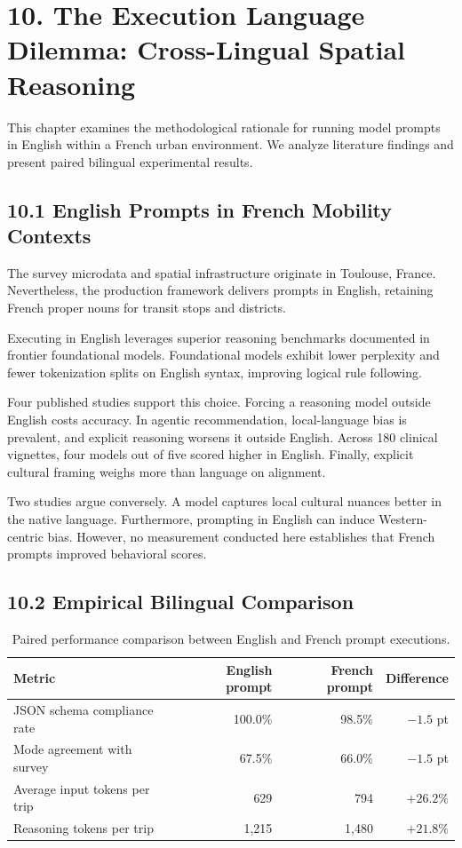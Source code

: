 \section{10. The Execution Language Dilemma: Cross-Lingual Spatial Reasoning}

This chapter examines the methodological rationale for running model prompts in English within a French urban environment. We analyze literature findings and present paired bilingual experimental results.

\subsection{10.1 English Prompts in French Mobility Contexts}

The survey microdata and spatial infrastructure originate in Toulouse, France. Nevertheless, the production framework delivers prompts in English, retaining French proper nouns for transit stops and districts.

Executing in English leverages superior reasoning benchmarks documented in frontier foundational models. Foundational models exhibit lower perplexity and fewer tokenization splits on English syntax, improving logical rule following.

Four published studies support this choice. Forcing a reasoning model outside English costs accuracy. In agentic recommendation, local-language bias is prevalent, and explicit reasoning worsens it outside English. Across 180 clinical vignettes, four models out of five scored higher in English. Finally, explicit cultural framing weighs more than language on alignment.

Two studies argue conversely. A model captures local cultural nuances better in the native language. Furthermore, prompting in English can induce Western-centric bias. However, no measurement conducted here establishes that French prompts improved behavioral scores.

\subsection{10.2 Empirical Bilingual Comparison}

\begin{table}[h]
\centering
\caption{Paired performance comparison between English and French prompt executions.}
\label{tab-bilingual}
\small
\begin{tabular}{lrrr}
\toprule
\textbf{Metric} & \textbf{English prompt} & \textbf{French prompt} & \textbf{Difference} \\
\midrule
JSON schema compliance rate & 100.0\% & 98.5\% & $-1.5$ pt \\
Mode agreement with survey & 67.5\% & 66.0\% & $-1.5$ pt \\
Average input tokens per trip & 629 & 794 & $+26.2\%$ \\
Reasoning tokens per trip & 1,215 & 1,480 & $+21.8\%$ \\
\bottomrule
\end{tabular}
\end{table}

